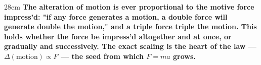 \documentclass[border=4pt]{standalone}
\begin{document}
\begin{varwidth}{28em}
\large\bfseries
The alteration of motion is ever proportional to the motive force impress'd: "if any force generates a motion, a double force will generate double the motion," and a triple force triple the motion. This holds whether the force be impress'd altogether and at once, or gradually and successively. The exact scaling is the heart of the law --- $\Delta(\text{motion}) \propto F$ --- the seed from which $F = ma$ grows.
\end{varwidth}
\end{document}
